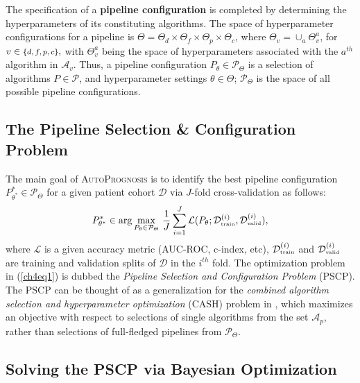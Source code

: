 \documentclass [PhD] {uclathes}
\begin{document}
The specification of a {\bf pipeline configuration} is completed by determining the hyperparameters of its constituting algorithms. The space of hyperparameter configurations for a pipeline is $\Theta = \Theta_d \times \Theta_f \times \Theta_p \times \Theta_c$, where $\Theta_v = \cup_{a}\Theta^{a}_v$, for $v \in \mbox{\footnotesize $\{d,f,p,c\}$},$ with $\Theta^{a}_v$ being the space of hyperparameters associated with the $a^{th}$ algorithm in $\mathcal{A}_v$. Thus, a pipeline configuration $P_\theta \in \mathcal{P}_{\Theta}$ is a selection of algorithms $P \in \mathcal{P}$, and hyperparameter settings $\theta \in \Theta$; $\mathcal{P}_{\Theta}$ is the space of all possible pipeline configurations.

\subsection{The Pipeline Selection \& Configuration Problem}

The main goal of {\footnotesize \textsc{AutoPrognosis}} is to identify the best pipeline configuration $P^*_{\theta^*} \in \mathcal{P}_{\Theta}$ for a given patient cohort $\mathcal{D}$ via $J$-fold cross-validation as follows: 
\begin{align}
P^*_{\theta^*} \in \arg \max_{P_\theta \in \mathcal{P}_\Theta}\, \frac{1}{J}\sum_{i=1}^{J}\mathcal{L}(P_\theta;\mathcal{D}^{(i)}_{\mbox{\tiny train}},\mathcal{D}^{(i)}_{\tiny \mbox{valid}}),
\label{ch4eq1}
\end{align}
where $\mathcal{L}$ is a given accuracy metric (AUC-ROC, c-index, etc), $\mathcal{D}^{(i)}_{\mbox{\tiny train}}$ and $\mathcal{D}^{(i)}_{\tiny \mbox{valid}}$ are training and validation splits of $\mathcal{D}$ in the $i^{th}$ fold. The optimization problem in (\ref{ch4eq1}) is dubbed the {\it Pipeline Selection and Configuration Problem} (PSCP). The PSCP can be thought of as a generalization for the {\it combined algorithm selection and hyperparameter optimization} (CASH) problem in \cite{feurer2015efficient,kotthoff2016auto}, which maximizes an objective with respect to selections of single algorithms from the set $\mathcal{A}_p$, rather than selections of full-fledged pipelines from $\mathcal{P}_{\Theta}$.

\subsection{Solving the PSCP via Bayesian Optimization}
\end{document}
